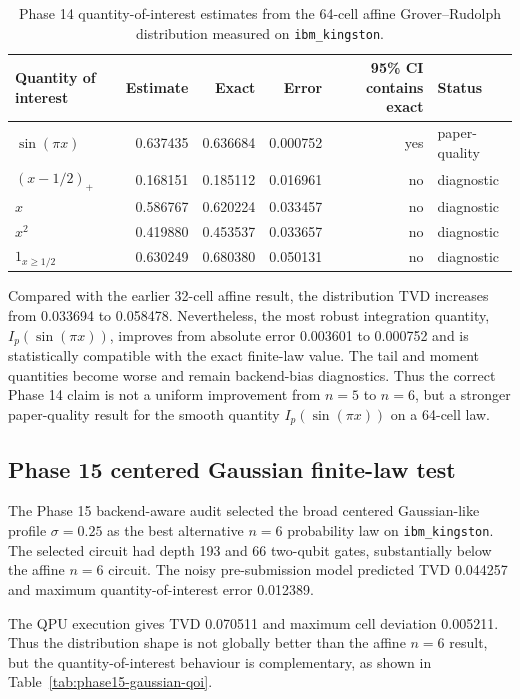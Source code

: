 \begin{table}[h]
\centering
\small
\begin{tabular}{lrrrrl}
\toprule
Quantity of interest & Estimate & Exact & Error & 95\% CI contains exact & Status \\
\midrule
\(\sin(\pi x)\) & 0.637435 & 0.636684 & 0.000752 & yes & paper-quality \\
\((x-1/2)_+\) & 0.168151 & 0.185112 & 0.016961 & no & diagnostic \\
\(x\) & 0.586767 & 0.620224 & 0.033457 & no & diagnostic \\
\(x^2\) & 0.419880 & 0.453537 & 0.033657 & no & diagnostic \\
\(1_{x\ge 1/2}\) & 0.630249 & 0.680380 & 0.050131 & no & diagnostic \\
\bottomrule
\end{tabular}
\caption{Phase 14 quantity-of-interest estimates from the 64-cell affine
Grover--Rudolph distribution measured on \texttt{ibm\_kingston}.}
\label{tab:phase14-affine-n6-qoi}
\end{table}

Compared with the earlier 32-cell affine result, the distribution TVD increases
from 0.033694 to 0.058478. Nevertheless, the most robust integration quantity,
\(I_p(\sin(\pi x))\), improves from absolute error 0.003601 to 0.000752 and is
statistically compatible with the exact finite-law value. The tail and moment
quantities become worse and remain backend-bias diagnostics. Thus the correct
Phase 14 claim is not a uniform improvement from \(n=5\) to \(n=6\), but a
stronger paper-quality result for the smooth quantity \(I_p(\sin(\pi x))\) on a
64-cell law.

\subsection{Phase 15 centered Gaussian finite-law test}

The Phase 15 backend-aware audit selected the broad centered Gaussian-like
profile \(\sigma=0.25\) as the best alternative \(n=6\) probability law on
\texttt{ibm\_kingston}. The selected circuit had depth 193 and 66 two-qubit
gates, substantially below the affine \(n=6\) circuit. The noisy pre-submission
model predicted TVD 0.044257 and maximum quantity-of-interest error 0.012389.

The QPU execution gives TVD 0.070511 and maximum cell deviation 0.005211. Thus
the distribution shape is not globally better than the affine \(n=6\) result,
but the quantity-of-interest behaviour is complementary, as shown in
Table~\ref{tab:phase15-gaussian-qoi}.

